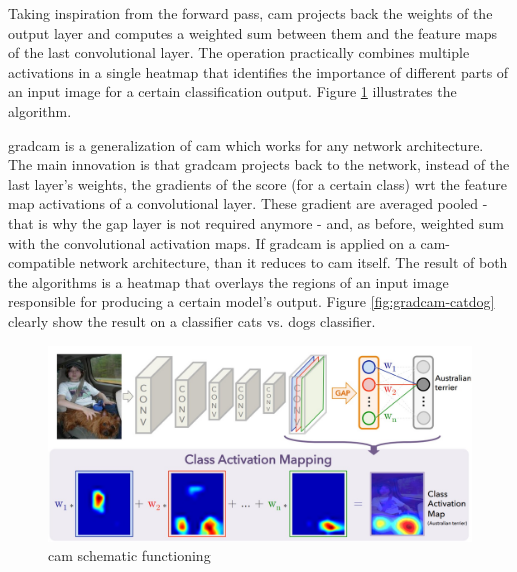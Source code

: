 Taking inspiration from the forward pass, \gls{cam} projects back the weights of the output layer and computes a weighted sum between them and the feature maps of the last convolutional layer. The operation practically combines multiple activations in a single heatmap that identifies the importance of different parts of an input image for a certain classification output. Figure \ref{fig:cam-schema} illustrates the algorithm. 

\medskip

\gls{gradcam} is a generalization of \gls{cam} which works for any network architecture. The main innovation is that \gls{gradcam} projects back to the network, instead of the last layer's weights, the gradients of the score (for a certain class) \gls{wrt} the feature map activations of a convolutional layer. These gradient are averaged pooled - that is why the \gls{gap} layer is not required anymore - and, as before, weighted sum with the convolutional activation maps. If \gls{gradcam} is applied on a \gls{cam}-compatible network architecture, than it reduces to \gls{cam} itself. The result of both the algorithms is a heatmap that overlays the regions of an input image responsible for producing a certain model's output. Figure \ref{fig:gradcam-catdog} clearly show the result on a classifier cats vs. dogs classifier.

\begin{figure}[H]
	\centering
	\includegraphics[width=1\textwidth]{"contents/images/02-cam"}
	\caption[\gls{cam} schematic functioning]{\gls{cam} schematic functioning \cite{zhou2015learning}}
	\label{fig:cam-schema}
\end{figure}


